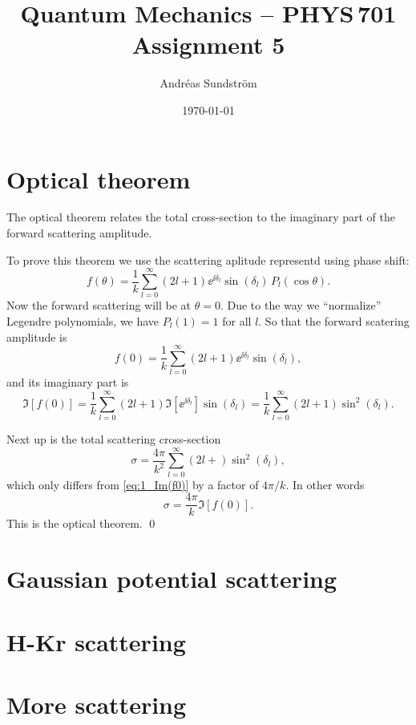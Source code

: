 \documentclass[11pt,letter, swedish, english
]{article}
\begin{document}
\title{Quantum Mechanics -- PHYS\,701 \\
Assignment 5}
\author{Andréas Sundström}
\date{\today}

\maketitle



\section{Optical theorem}
The optical theorem relates the total cross-section to the imaginary
part of the forward scattering amplitude. 

To prove this theorem we use the scattering aplitude representd using
phase shift:
\begin{equation}
f(\theta)=\frac{1}{k}\sum_{l=0}^\infty
(2l+1)\ee^{\ii\delta_l}\sin(\delta_l)\,P_l(\cos\theta).
\end{equation}
Now the forward scattering will be at $\theta=0$. Due to the way
we ``normalize'' Legendre polynomials\footnotemark{}, we have $P_l(1)=1$
for all $l$. So that the forward scatering amplitude is
\begin{equation}
f(0)=\frac{1}{k}\sum_{l=0}^\infty
(2l+1)\ee^{\ii\delta_l}\sin(\delta_l),
\end{equation}
and its imaginary part is
\begin{equation}\label{eq:1_Im(f0)}
\Im[f(0)]=\frac{1}{k}\sum_{l=0}^\infty
(2l+1)\Im[\ee^{\ii\delta_l}]\sin(\delta_l)
=\frac{1}{k}\sum_{l=0}^\infty (2l+1)\sin^2(\delta_l).
\end{equation}


Next up is the total scattering cross-section
\begin{equation}
\sigma=\frac{4\pi}{k^2}\sum_{l=0}^\infty
(2l+)\sin^2(\delta_l),
\end{equation}
which only differs from \eqref{eq:1_Im(f0)} by a factor of
$4\pi/k$. In other words
\begin{equation}
\sigma=\frac{4\pi}{k}\Im[f(0)].
\end{equation}
This is the optical theorem.
\qed

\section{Gaussian potential scattering}



\section{H-Kr scattering}


\section{More scattering}
\end{document}
